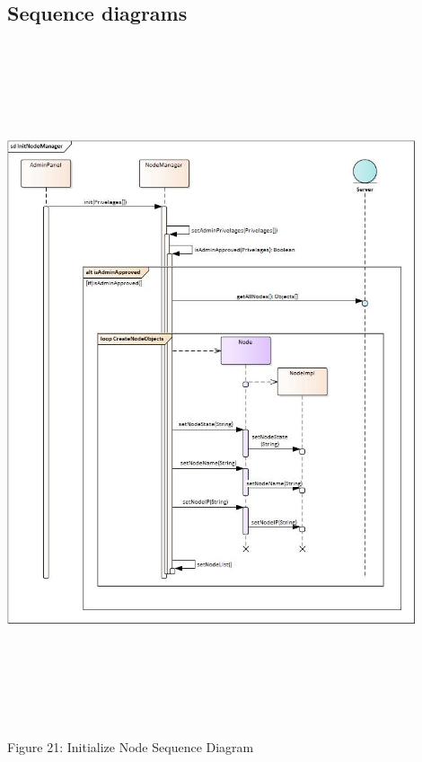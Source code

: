 \subsection{Sequence diagrams}
    \bigskip
    \includegraphics[width=12cm,height=20cm,keepaspectratio]{admin_ui/images/sequence_diagrams/InitNodeManager.jpg}
	\begin{center}
	    \small{Figure 21: Initialize Node Sequence Diagram}
    \end{center}
    

